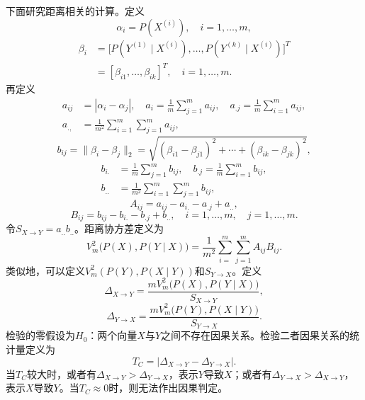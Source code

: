 下面研究距离相关的计算。定义
\begin{equation}
\alpha_i=P(X^{(i)}),\quad i=1,\ldots,m,\tag{7.183}
\end{equation}
\begin{equation}
\begin{aligned}
\beta_i&=\bigl[P(Y^{(1)}\mid X^{(i)}),\ldots,P(Y^{(k)}\mid X^{(i)})\bigr]^T\\
&=[\beta_{i1},\ldots,\beta_{ik}]^T,\quad i=1,\ldots,m.
\end{aligned}\tag{7.184}
\end{equation}
再定义
\begin{equation}
\begin{aligned}
a_{ij}&=|\alpha_i-\alpha_j|,\quad
a_i=\frac1m\sum_{j=1}^m a_{ij},\quad
a_{.j}=\frac1m\sum_{i=1}^m a_{ij},\\
a_{.,}&=\frac1{m^2}\sum_{i=1}^m\sum_{j=1}^m a_{ij},
\end{aligned}\tag{7.185}
\end{equation}
\[
b_{ij}=\|\beta_i-\beta_j\|_2
=\sqrt{(\beta_{i1}-\beta_{j1})^2+\cdots+(\beta_{ik}-\beta_{jk})^2},
\]
\[
\begin{aligned}
b_{i.}&=\frac1m\sum_{j=1}^m b_{ij},\quad
b_{.j}=\frac1m\sum_{i=1}^m b_{ij},\\
b_{..}&=\frac1{m^2}\sum_{i=1}^m\sum_{j=1}^m b_{ij},
\end{aligned}
\]
\begin{equation}
A_{ij}=a_{ij}-a_{i.}-a_{.j}+a_{..},\tag{7.186}
\end{equation}
\begin{equation}
B_{ij}=b_{ij}-b_{i.}-b_{.j}+b_{..},\quad i=1,\ldots,m,\quad j=1,\ldots,m.\tag{7.187}
\end{equation}
令$S_{X\to Y}=a_{..}b_{..}$。距离协方差定义为
\begin{equation}
V_m^2\bigl(P(X),P(Y\mid X)\bigr)
=\frac1{m^2}\sum_{i=}^{m}\sum_{j=1}^{m}A_{ij}B_{ij}.\tag{7.188}
\end{equation}
类似地，可以定义$V_m^2(P(Y),P(X\mid Y))$和$S_{Y\to X}$。定义
\begin{equation}
\Delta_{X\to Y}=\frac{mV_m^2\bigl(P(X),P(Y\mid X)\bigr)}{S_{X\to Y}},\tag{7.189}
\end{equation}
\begin{equation}
\Delta_{Y\to X}=\frac{mV_m^2\bigl(P(Y),P(X\mid Y)\bigr)}{S_{Y\to X}}.\tag{7.190}
\end{equation}
检验的零假设为$H_0$：两个向量$X$与$Y$之间不存在因果关系。检验二者因果关系的统计量定义为
\begin{equation}
T_C=|\Delta_{X\to Y}-\Delta_{Y\to X}|.\tag{7.191}
\end{equation}
当$T_C$较大时，或者有$\Delta_{X\to Y}>\Delta_{Y\to X}$，表示$Y$导致$X$；或者有$\Delta_{Y\to X}>\Delta_{X\to Y}$，表示$X$导致$Y$。当$T_C\approx0$时，则无法作出因果判定。

